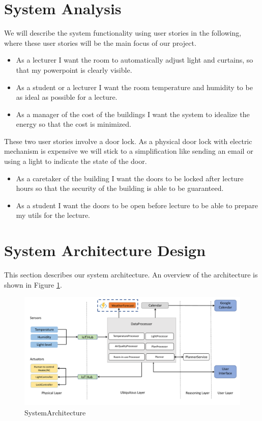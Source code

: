 \documentclass[runningheads]{llncs}
\begin{document}
\section{System Analysis}
We will describe the system functionality using user stories in the following, where these user stories will be the main focus of our project.
\begin{itemize}
\item As a lecturer I want the room to automatically adjust light and curtains, so that my powerpoint is clearly visible.
\item As a student or a lecturer I want the room temperature and humidity to be as ideal as possible for a lecture.
\item As a manager of the cost of the buildings I want the system to idealize the energy so that the cost is minimized.
\end{itemize}
 
These two user stories involve a door lock. As a physical door lock with electric mechanism is expensive we will stick to a simplification like sending an email or using a light to indicate the state of the door.
\begin{itemize}
\item As a caretaker of the building I want the doors to be locked after lecture hours so that the security of the building is able to be guaranteed. 
\item As a student I want the doors to be open before lecture to be able to prepare my utils for the lecture.\\
\end{itemize}

\section{System Architecture Design}
This section describes our system architecture. An overview of the architecture is shown in Figure \ref{fig:SystemArchitecture}.

\begin{figure}[H]
\centering
\includegraphics[width=1.0\textwidth]{../img/SystemArchitecture.pdf}
\caption{SystemArchitecture}
\label{fig:SystemArchitecture}
\end{figure}
\end{document}
